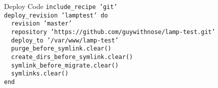 \documentclass{beamer}
\begin{document}
    \begin{frame}{Deploy Code}
        \texttt{include\_recipe 'git'\\
            \medskip
            deploy\_revision 'lamptest' do\\
            ~~revision 'master'\\
            ~~repository 'https://github.com/guywithnose/lamp-test.git'\\
            ~~deploy\_to '/var/www/lamp-test'\\
            ~~purge\_before\_symlink.clear()\\
            ~~create\_dirs\_before\_symlink.clear()\\
            ~~symlink\_before\_migrate.clear()\\
            ~~symlinks.clear()\\
            end
        }
    \end{frame}
\end{document}
